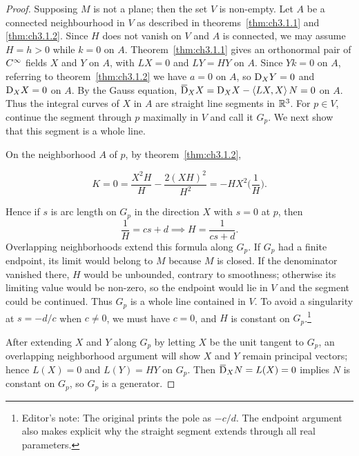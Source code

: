 \documentclass[../main]{subfiles}
\begin{document}
\begin{proof}
Supposing $M$ is not a plane; then the set $V$ is non-empty. Let $A$ be a connected neighbourhood in $V$ as described in theorems~\ref{thm:ch3.1.1} and \ref{thm:ch3.1.2}. Since $H$ does not vanish on $V$ and $A$ is connected, we may assume $H = h > 0$ while $k = 0$ on $A$. Theorem~\ref{thm:ch3.1.1} gives an orthonormal pair of $C^\infty$ fields $X$ and $Y$ on $A$, with $LX = 0$ and $LY = HY$ on $A$. Since $Yk = 0$ on $A$, referring to theorem~\ref{thm:ch3.1.2} we have $a = 0$ on $A$, so $\mathrm{D}_X Y = 0$ and $\mathrm{D}_X X = 0$ on $A$. By the Gauss equation, $\covariant_X X = \connection_X X - \ip {L X} X N = 0$ on $A$. Thus the integral curves of $X$ in $A$ are straight line segments in $\mathbb{R}^3$. For $p\in V$, continue the segment through $p$ maximally in $V$ and call it $G_p$. We next show that this segment is a whole line.

On the neighborhood $A$ of $p$, by theorem~\ref{thm:ch3.1.2},

\[
K = 0 = \frac {X^2 H} H - \frac {2(XH)^2} {H^2} = -HX^2 \biggl(\frac 1 H\biggr).
\]

Hence if $s$ is arc length on $G_p$ in the direction $X$ with $s = 0$ at $p$, then \[\dfrac{1}{H} = cs +d \implies H = \dfrac{1}{cs + d}.\]Overlapping neighborhoods extend this formula along $G_p$. If $G_p$ had a finite endpoint, its limit would belong to $M$ because $M$ is closed. If the denominator vanished there, $H$ would be unbounded, contrary to smoothness; otherwise its limiting value would be non-zero, so the endpoint would lie in $V$ and the segment could be continued. Thus $G_p$ is a whole line contained in $V$. To avoid a singularity at $s=-d/c$ when $c\ne0$, we must have $c=0$, and $H$ is constant on $G_p$.\footnote{Editor's note: The original prints the pole as $-c/d$. The endpoint argument also makes explicit why the straight segment extends through all real parameters.}

After extending $X$ and $Y$ along $G_p$ by letting $X$ be the unit tangent to $G_p$, an overlapping neighborhood argument will show $X$ and $Y$ remain principal vectors; hence $L(X) = 0$ and $L(Y) = HY$ on $G_p$. Then $\covariant_X N = L(X) = 0$ implies $N$ is constant on $G_p$, so $G_p$ is a generator.


\end{proof}
\end{document}
